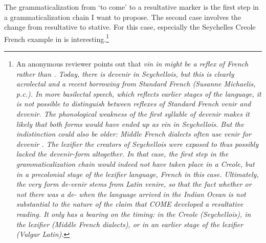 \documentclass[a4paper,12pt]{article}
\begin{document}


The grammaticalization from `to come' to a resultative marker is the first step in a grammaticalization chain I want to propose. The second case involves the change from resultative to stative. For this case, especially the Seychelles Creole French example in  is interesting.\footnote{An 
 anonymous reviewer points out that \em vin \em in  might be a reflex of French  rather than . Today, there is \em devenir \em in Seychellois, but this is clearly acrolectal and a recent borrowing from Standard French (Susanne Michaelis, p.c.). In more basilectal speech, which reflects earlier stages of the language, it is not possible to distinguish between reflexes of Standard French \em venir \em and \em devenir\em. The phonological weakness of the first syllable of \em devenir \em makes it likely that both forms would have ended up as \em vin \em in Seychellois. But the indistinction could also be older: Middle French dialects often use \em venir \em for \em devenir \em \citep{Chaudenson, EFW, Bolle}. The lexifier the creators of Seychellois were exposed to thus possibly lacked the \em devenir\em-form altogether. In that case, the first step in the grammaticalization chain would indeed not have taken place in a Creole, but in a precolonial stage of the lexifier language, French in this case. Ultimately, the very form \em de-venir \em stems from Latin \em venire\em, so that the fact whether or not there was a \em de- \em when the language arrived in the Indian Ocean is not substantial to the nature of the claim that COME developed a resultative reading. It only has a bearing on the timing: in the Creole (Seychellois), in the lexifier (Middle French dialects), or in an earlier stage of the lexifier (Vulgar Latin).} 
 
\end{document}
